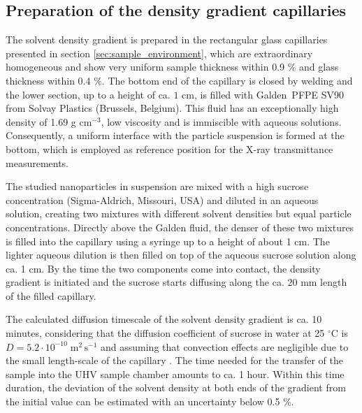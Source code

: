 \subsection{Preparation of the density gradient capillaries}
\label{sec:GradientPreparation}
The solvent density gradient is prepared in the rectangular glass capillaries presented in section \ref{sec:sample_environment}, which are extraordinary homogeneous and show very uniform sample thickness within 0.9 $\%$ and glass thickness within 0.4 $\%$. The bottom end of the capillary is closed by welding and the lower section, up to a height of ca. \(1\) cm, is filled with Galden\textregistered\ PFPE SV90 from Solvay Plastics (Brussels, Belgium). This fluid has an exceptionally high density of 1.69 g cm$^{-3}$, low viscosity and is immiscible with aqueous solutions. Consequently, a uniform interface with the particle suspension is formed at the bottom, which is employed as reference position for the X-ray transmittance measurements. 

The studied nanoparticles in suspension are mixed with a high sucrose concentration (Sigma-Aldrich, Missouri, USA) and diluted in an aqueous solution, creating two mixtures with different solvent densities but equal particle concentrations. Directly above the Galden fluid, the denser of these two mixtures is filled into the capillary using a syringe up to a height of about 1 cm. The lighter aqueous dilution is then filled on top of the aqueous sucrose solution along ca. 1 cm. By the time the two components come into contact, the density gradient is initiated and the sucrose starts diffusing along the ca. 20 mm length of the filled capillary.

The calculated diffusion timescale of the solvent density gradient is ca. 10 minutes, considering that the diffusion coefficient of sucrose in water at 25 $^{\circ}$C is $D=5.2 \cdot 10^{-10} \;\mbox{m}^2\,\mbox{s}^{-1}$ \citep{uedaira_sugar-water_1985,ribeiro_binary_2006} and assuming that convection effects are negligible due to the small length-scale of the capillary \citep{berberan-santos_barometric_1997}. The time needed for the transfer of the sample into the UHV sample chamber amounts to ca. 1 hour. Within this time duration, the deviation of the solvent density at both ends of the gradient from the initial value can be estimated with an uncertainty below 0.5 $\%$. 


